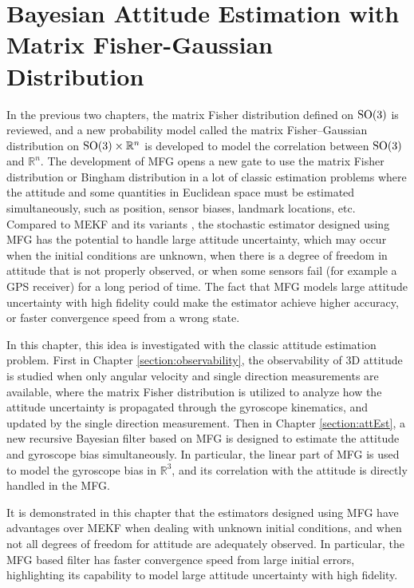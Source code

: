 
\chapter{Bayesian Attitude Estimation with Matrix Fisher-Gaussian Distribution} \label{chap:att-estimation}

In the previous two chapters, the matrix Fisher distribution defined on $\mathrm{SO}(3)$ is reviewed, and a new probability model called the matrix Fisher--Gaussian distribution on $\mathrm{SO}(3)\times \mathbb{R}^n$ is developed to model the correlation between $\mathrm{SO}(3)$ and $\mathbb{R}^n$.
The development of MFG opens a new gate to use the matrix Fisher distribution or Bingham distribution in a lot of classic estimation problems where the attitude and some quantities in Euclidean space must be estimated simultaneously, such as position, sensor biases, landmark locations, etc.
Compared to MEKF and its variants \cite{mourikis2007multi,sola2017quaternion}, the stochastic estimator designed using MFG has the potential to handle large attitude uncertainty, which may occur when the initial conditions are unknown, when there is a degree of freedom in attitude that is not properly observed, or when some sensors fail (for example a GPS receiver) for a long period of time.
The fact that MFG models large attitude uncertainty with high fidelity could make the estimator achieve higher accuracy, or faster convergence speed from a wrong state.

In this chapter, this idea is investigated with the classic attitude estimation problem.
First in Chapter \ref{section:observability}, the observability of 3D attitude is studied when only angular velocity and single direction measurements are available, where the matrix Fisher distribution is utilized to analyze how the attitude uncertainty is propagated through the gyroscope kinematics, and updated by the single direction measurement.
Then in Chapter \ref{section:attEst}, a new recursive Bayesian filter based on MFG is designed to estimate the attitude and gyroscope bias simultaneously.
In particular, the linear part of MFG is used to model the gyroscope bias in $\mathbb{R}^3$, and its correlation with the attitude is directly handled in the MFG.

It is demonstrated in this chapter that the estimators designed using MFG have advantages over MEKF when dealing with unknown initial conditions, and when not all degrees of freedom for attitude are adequately observed.
In particular, the MFG based filter has faster convergence speed from large initial errors, highlighting its capability to model large attitude uncertainty with high fidelity.

